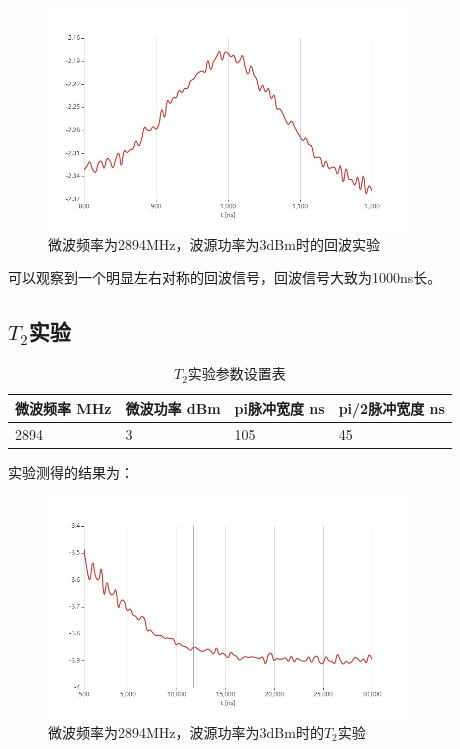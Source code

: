 \documentclass[a4paper,UTF8]{ctexart}
\begin{document}
\begin{figure}[H]
    \centering
    \begin{minipage}[b]{0.9\textwidth}
        \centering
        \includegraphics[width=0.85\textwidth]{./6.jpeg}
        \caption{微波频率为2894MHz，波源功率为3dBm时的回波实验}
    \end{minipage}
\end{figure}

可以观察到一个明显左右对称的回波信号，回波信号大致为1000ns长。

\subsection{$T_2$实验}

\begin{table}[H]
    \centering
    \caption{$T_2$实验参数设置表}
    \begin{tabular}{|l|l|l|l|}
    \hline
        微波频率 MHz & 微波功率 dBm & pi脉冲宽度 ns & pi/2脉冲宽度 ns \\ \hline
        2894 & 3 & 105 & 45 \\ \hline
    \end{tabular}
\end{table}

实验测得的结果为：

\begin{figure}[H]
    \centering
    \begin{minipage}[b]{0.9\textwidth}
        \centering
        \includegraphics[width=0.85\textwidth]{./7.jpeg}
        \caption{微波频率为2894MHz，波源功率为3dBm时的$T_2$实验}
    \end{minipage}
\end{figure}
\end{document}
